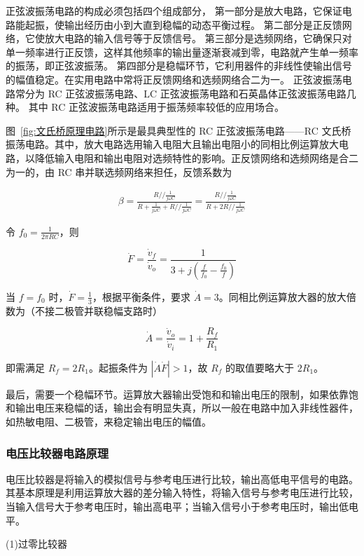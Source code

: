 \documentclass[10pt, a4paper]{article} %
\begin{document}
正弦波振荡电路的构成必须包括四个组成部分，
第一部分是放大电路，它保证电路能起振，使输出经历由小到大直到稳幅的动态平衡过程。
第二部分是正反馈网络，它使放大电路的输入信号等于反馈信号。
第三部分是选频网络，它确保只对单一频率进行正反馈，这样其他频率的输出量逐渐衰减到零，电路就产生单一频率的振荡，即正弦波振荡。
第四部分是稳幅环节，它利用器件的非线性使输出信号的幅值稳定。在实用电路中常将正反馈网络和选频网络合二为一。
正弦波振荡电路常分为 RC 正弦波振荡电路、LC 正弦波振荡电路和石英晶体正弦波振荡电路几种。
其中 RC 正弦波振荡电路适用于振荡频率较低的应用场合。

图~\hyperref[fig:文氏桥原理电路]{\ref{fig:文氏桥原理电路}}所示是最具典型性的 RC 正弦波振荡电路——RC 文氏桥振荡电路。其中，放大电路选用输入电阻大且输出电阻小的同相比例运算放大电路，以降低输入电阻和输出电阻对选频特性的影响。正反馈网络和选频网络是合二为一的，由 RC 串并联选频网络来担任，反馈系数为


\begin{align}
    \beta = \frac{R // \frac{1}{j\omega C}}{R + \frac{1}{j\omega C} + R // \frac{1}{j\omega C}} = \frac{R // \frac{1}{j\omega C}}{R + 2R // \frac{1}{j\omega C}}
\end{align}
\label{eq:反馈系数}

令 $f_0 = \frac{1}{2\pi RC}$，则


 $$
\dot{F} = \frac{\dot{v}_f}{\dot{v}_o} = \frac{1}{3 + j\left(\frac{f}{f_0} - \frac{f_0}{f}\right)}
$$ 

当 $f = f_0$ 时，$\dot{F} = \frac{1}{3}$，根据平衡条件，要求 $\dot{A} = 3$。同相比例运算放大器的放大倍数为（不接二极管并联稳幅支路时）


 $$
\dot{A} = \frac{\dot{v}_o}{\dot{v}_i} = 1 + \frac{R_f}{R_1}
$$ 

即需满足 $R_f = 2R_1$。起振条件为 $|\dot{A}\dot{F}| > 1$，故 $R_f$ 的取值要略大于 $2R_1$。

最后，需要一个稳幅环节。运算放大器输出受饱和和输出电压的限制，如果依靠饱和输出电压来稳幅的话，输出会有明显失真，所以一般在电路中加入非线性器件，如热敏电阻、二极管，来稳定输出电压的幅值。

\subsubsection{电压比较器电路原理}
电压比较器是将输入的模拟信号与参考电压进行比较，输出高低电平信号的电路。其基本原理是利用运算放大器的差分输入特性，将输入信号与参考电压进行比较，当输入信号大于参考电压时，输出高电平；当输入信号小于参考电压时，输出低电平。

(1)过零比较器
\end{document}
